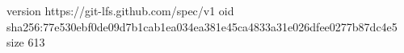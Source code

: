 version https://git-lfs.github.com/spec/v1
oid sha256:77e530ebf0de09d7b1cab1ea034ea381e45ca4833a31e026dfee0277b87dc4e5
size 613
